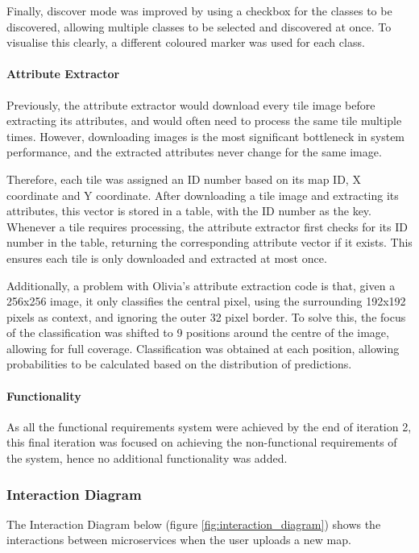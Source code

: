Finally, discover mode was improved by using a checkbox for the classes to be discovered, allowing multiple classes to be selected and discovered at once. To visualise this clearly, a different coloured marker was used for each class.  

\paragraph{Attribute Extractor\\}
Previously, the attribute extractor would download every tile image before extracting its attributes, and would often need to process the same tile multiple times. However, downloading images is the most significant bottleneck in system performance, and the extracted attributes never change for the same image.

Therefore, each tile was assigned an ID number based on its map ID, X coordinate and Y coordinate. After downloading a tile image and extracting its attributes, this vector is stored in a table, with the ID number as the key. Whenever a tile requires processing, the attribute extractor first checks for its ID number in the table, returning the corresponding attribute vector if it exists. This ensures each tile is only downloaded and extracted at most once. 

Additionally, a problem with Olivia’s attribute extraction code is that, given a 256x256 image, it only classifies the central pixel, using the surrounding 192x192 pixels as context, and ignoring the outer 32 pixel border. To solve this, the focus of the classification was shifted to 9 positions around the centre of the image, allowing for full coverage. Classification was obtained at each position, allowing probabilities to be calculated based on the distribution of predictions. 
\paragraph{Functionality\\}
As all the functional requirements system were achieved by the end of iteration 2, this final iteration was focused on achieving the non-functional requirements of the system, hence no additional functionality was added.

\subsubsection{Interaction Diagram}
The Interaction Diagram below (figure \ref{fig:interaction_diagram}) shows the interactions between microservices when the user uploads a new map.


